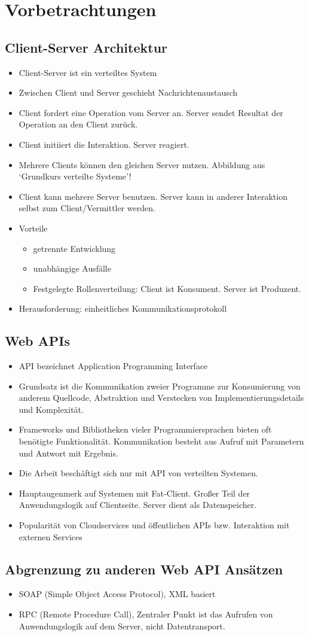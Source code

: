 \section{Vorbetrachtungen}
\subsection{Client-Server Architektur}
\begin{itemize}
  \item Client-Server ist ein verteiltes System
  \item Zwischen Client und Server geschieht Nachrichtenaustausch
  \item Client fordert eine Operation vom Server an. Server sendet Resultat der Operation an den Client zurück.
  \item Client initiiert die Interaktion. Server reagiert.
  \item Mehrere Clients können den gleichen Server nutzen. Abbildung aus `Grundkurs verteilte Systeme'!
  \item Client kann mehrere Server benutzen. Server kann in anderer Interaktion selbst zum Client/Vermittler werden.
  \item Vorteile
    \begin{itemize}
      \item getrennte Entwicklung
      \item unabhängige Ausfälle
      \item Festgelegte Rollenverteilung: Client ist Konsument. Server ist Produzent.
    \end{itemize}
  \item Herausforderung: einheitliches Kommunikationsprotokoll
\end{itemize}

\subsection{Web APIs}
\begin{itemize}
  \item API bezeichnet Application Programming Interface
  \item Grundsatz ist die Kommunikation zweier Programme zur Konsumierung von anderem Quellcode, Abstraktion und Verstecken von Implementierungsdetails und Komplexität.
  \item Frameworks und Bibliotheken vieler Programmiersprachen bieten oft benötigte Funktionalität. Kommunikation besteht aus Aufruf mit Parametern und Antwort mit Ergebnis.
  \item Die Arbeit beschäftigt sich nur mit API von verteilten Systemen.
  \item Hauptaugenmerk auf Systemen mit Fat-Client. Großer Teil der Anwendungslogik auf Clientseite. Server dient als Datenspeicher.
  \item Popularität von Cloudservices und öffentlichen APIs bzw. Interaktion mit externen Services
\end{itemize}

\subsection{Abgrenzung zu anderen Web API Ansätzen}
\begin{itemize}
  \item SOAP (Simple Object Access Protocol), XML basiert
  \item RPC (Remote Procedure Call), Zentraler Punkt ist das Aufrufen von Anwendungslogik auf dem Server, nicht Datentransport.
\end{itemize}
